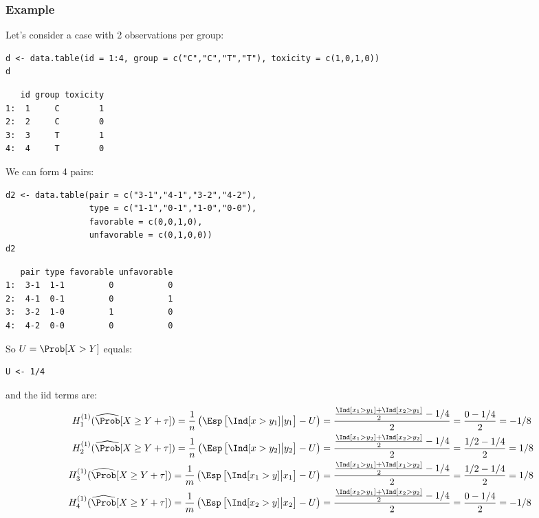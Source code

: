\documentclass[12pt]{article}
\begin{document}
\clearpage

\subsubsection{Example}
\label{sec:org185f30d}

Let's consider a case with 2 observations per group:
\lstset{language=r,label= ,caption= ,captionpos=b,numbers=none}
\begin{lstlisting}
d <- data.table(id = 1:4, group = c("C","C","T","T"), toxicity = c(1,0,1,0))
d
\end{lstlisting}

\begin{verbatim}
   id group toxicity
1:  1     C        1
2:  2     C        0
3:  3     T        1
4:  4     T        0
\end{verbatim}

We can form 4 pairs:
\lstset{language=r,label= ,caption= ,captionpos=b,numbers=none}
\begin{lstlisting}
d2 <- data.table(pair = c("3-1","4-1","3-2","4-2"), 
				 type = c("1-1","0-1","1-0","0-0"),
				 favorable = c(0,0,1,0),
				 unfavorable = c(0,1,0,0))
d2
\end{lstlisting}

\begin{verbatim}
   pair type favorable unfavorable
1:  3-1  1-1         0           0
2:  4-1  0-1         0           1
3:  3-2  1-0         1           0
4:  4-2  0-0         0           0
\end{verbatim}

So \(U=\Prob[X>Y]\) equals:
\lstset{language=r,label= ,caption= ,captionpos=b,numbers=none}
\begin{lstlisting}
U <- 1/4
\end{lstlisting}

and the iid terms are:
\begin{align*}
H^{(1)}_1(\widehat{\Prob}[X \geq Y + \tau]) = \frac{1}{n} \left( \Esp\left[\Ind[x>y_1]\big|y_1\right]-U \right)&= \frac{ \frac{\Ind[x_1>y_1]+\Ind[x_2>y_1]}{2}- 1/4}{2} = \frac{0-1/4}{2} = -1/8 \\
H^{(1)}_2(\widehat{\Prob}[X \geq Y + \tau]) = \frac{1}{n} \left( \Esp\left[\Ind[x>y_2]\big|y_2\right]-U \right)&= \frac{ \frac{\Ind[x_1>y_2]+\Ind[x_2>y_2]}{2}- 1/4}{2} = \frac{1/2-1/4}{2} = 1/8 \\
H^{(1)}_3(\widehat{\Prob}[X \geq Y + \tau]) = \frac{1}{m} \left( \Esp\left[\Ind[x_1>y]\big|x_1\right]-U \right)&= \frac{ \frac{\Ind[x_1>y_1]+\Ind[x_1>y_2]}{2}- 1/4}{2} = \frac{1/2-1/4}{2} = 1/8 \\
H^{(1)}_4(\widehat{\Prob}[X \geq Y + \tau]) = \frac{1}{m} \left( \Esp\left[\Ind[x_2>y]\big|x_2\right]-U \right)&= \frac{ \frac{\Ind[x_2>y_1]+\Ind[x_2>y_2]}{2}- 1/4}{2} = \frac{0-1/4}{2} = -1/8
\end{align*}
\end{document}
